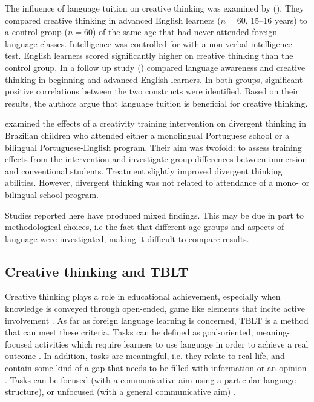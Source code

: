 \documentclass[output=paper]{langsci/langscibook}
\begin{document}
The influence of language tuition on creative thinking was examined by (\citealt{GhonsoolyShowqi2012}). They compared creative thinking in advanced English learners ($n=60$, 15--16 years) to a control group ($n=60$) of the same age that had never attended foreign language classes. Intelligence was controlled for with a non-verbal intelligence test. English learners scored significantly higher on creative thinking than the control group. In a follow up study (\citealt{ShowqiGhonsooly2015}) compared language awareness and creative thinking in beginning and advanced English learners. In both groups, significant positive correlations between the two constructs were identified. Based on their results, the authors argue that language tuition is beneficial for creative thinking.

\citet{FleithEtAl2002} examined the effects of a creativity training intervention on divergent thinking in Brazilian children who attended either a monolingual Portuguese school or a bilingual Portuguese-English program. Their aim was twofold: to assess training effects from the intervention and investigate group differences between immersion and conventional students. Treatment slightly improved divergent thinking abilities. However, divergent thinking was not related to attendance of a mono- or bilingual school program. 

Studies reported here have produced mixed findings. This may be due in part to methodological choices, i.e the fact that different age groups and aspects of language were investigated, making it difficult to compare results. 

\subsection{Creative thinking and TBLT}\label{sec:06:2.3}
\begin{sloppypar}
Creative thinking plays a role in educational achievement, especially when knowledge is conveyed through open-ended, game like elements that incite active involvement \citep{Runco2004}. As far as foreign language learning is concerned, TBLT is a method that can meet these criteria. Tasks can be defined as goal-oriented, meaning-focused activities which require learners to use language in order to achieve a real outcome \citep[2]{Willis1996}. In addition, tasks are meaningful, i.e. they relate to real-life, and contain some kind of a gap that needs to be filled with information or an opinion \citep{Ellis2017}. Tasks can be focused (with a communicative aim using a particular language structure), or unfocused (with a general communicative aim) \citep{Ellis2009}. 
\end{sloppypar}
\end{document}
